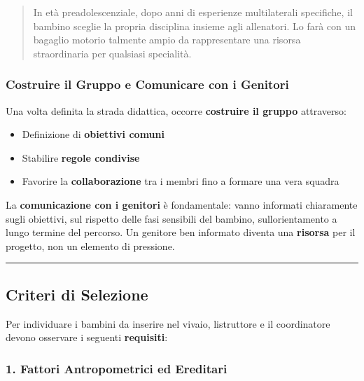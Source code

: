 \documentclass[a4paper,11pt]{article}
\providecommand{\tightlist}{%
  \setlength{\itemsep}{0pt}\setlength{\parskip}{0pt}}
\begin{document}
\begin{quote}
      In età preadolescenziale, dopo anni di esperienze multilaterali
      specifiche, il bambino sceglie la propria disciplina insieme agli
      allenatori. Lo farà con un bagaglio motorio talmente ampio da
      rappresentare una risorsa straordinaria per qualsiasi specialità.
\end{quote}

\subsubsection{Costruire il Gruppo e Comunicare con i
      Genitori}\label{costruire-il-gruppo-e-comunicare-con-i-genitori}

Una volta definita la strada didattica, occorre \textbf{costruire il
      gruppo} attraverso:

\begin{itemize}
      \tightlist
      \item
            Definizione di \textbf{obiettivi comuni}
      \item
            Stabilire \textbf{regole condivise}
      \item
            Favorire la \textbf{collaborazione} tra i membri fino a formare una
            vera squadra
\end{itemize}

La \textbf{comunicazione con i genitori} è fondamentale: vanno informati
chiaramente sugli obiettivi, sul rispetto delle fasi sensibili del
bambino, sull\textquotesingle orientamento a lungo termine del percorso.
Un genitore ben informato diventa una \textbf{risorsa} per il progetto,
non un elemento di pressione.

\begin{center}\rule{0.5\linewidth}{0.5pt}\end{center}

\subsection{Criteri di Selezione}\label{criteri-di-selezione}

Per individuare i bambini da inserire nel vivaio,
l\textquotesingle istruttore e il coordinatore devono osservare i
seguenti \textbf{requisiti}:

\subsubsection{1. Fattori Antropometrici ed
      Ereditari}\label{fattori-antropometrici-ed-ereditari}
\end{document}
